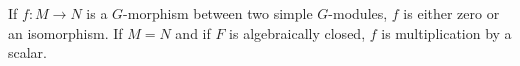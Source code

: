 If $f: M \to N$ is a $G$-morphism between two simple $G$-modules, $f$ is either zero or an isomorphism. If $M = N$ and if $F$ is algebraically closed, $f$ is multiplication by a scalar.
